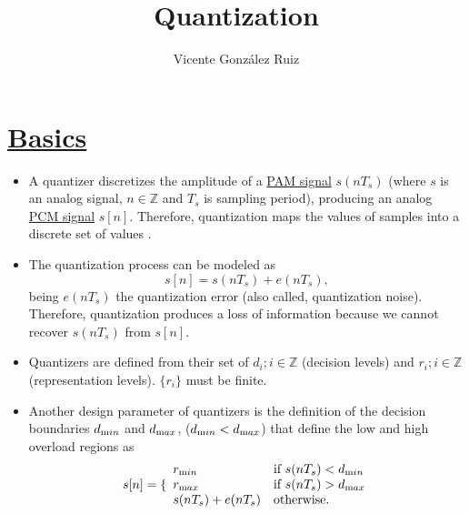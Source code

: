 
\title{Quantization}

\author{Vicente González Ruiz}

\maketitle

\section{\href{https://en.wikipedia.org/wiki/Quantization\_(signal\_processing)}{Basics}}
\begin{itemize}
\tightlist

\item
  A quantizer discretizes the amplitude of a
  \href{https://en.wikipedia.org/wiki/Pulse-amplitude_modulation}{PAM
    signal} \(s(nT_s)\) (where $s$ is an analog signal,
  $n\in{\mathbb{Z}}$ and $T_s$ is sampling period), producing an
  analog
  \href{https://en.wikipedia.org/wiki/Pulse-code_modulation}{PCM
    signal} $s[n]$. Therefore, quantization maps the 
  values of samples into a discrete set of values
  \cite{vetterli1995wavelets}.

\item
  The quantization process can be modeled as
  \begin{equation}
    s[n] = s(nT_s) + e(nT_s),
  \end{equation}
  being \(e(nT_s)\) the quantization error (also called, quantization
  noise). Therefore, quantization produces a loss of information
  because we cannot recover $s(nT_s)$ from $s[n]$.

\item
  Quantizers are defined from their set of \(d_i; i\in {\mathbb{Z}}\)
  (decision levels) and \(r_i; i\in {\mathbb{Z}}\) (representation
  levels). $\{r_i\}$ must be finite.

\item Another design parameter of quantizers is the definition of the
  decision boundaries $d_{\text min}$ and $d_{\text max}$, ($d_{\text min}<d_{\text max}$) that define the low and high
  overload regions as
  \begin{equation}
    s[n] = \{\begin{array}{ll}
    r_{\text min} & \text{if $s(nT_s)<d_{\text min}$} \\
    r_{\text max} & \text{if $s(nT_s)>d_{\text max}$} \\
    s(nT_s)+e(nT_s) & \text{otherwise}.
    \end{array}
  \end{equation}

\end{itemize}

